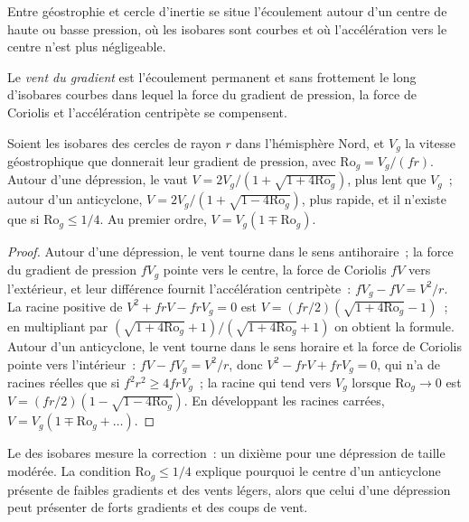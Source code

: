 Entre géostrophie et cercle d'inertie se situe l'écoulement autour d'un centre de
haute ou basse pression, où les isobares sont courbes et où
l'accélération vers le centre n'est plus négligeable.

\begin{definition}\label{def:b3:gfd-foundations:gradient}
Le \emph{vent du gradient} est l'écoulement permanent et sans frottement
le long d'isobares courbes dans lequel la force du gradient de pression, la
force de Coriolis et l'accélération centripète se compensent.
\end{definition}

\begin{proposition}\label{prop:b3:gfd-foundations:gradient}
Soient les isobares des cercles de rayon $r$ dans l'hémisphère Nord, et
$V_g$ la vitesse géostrophique que donnerait leur gradient de pression, avec
$\mathrm{Ro}_g = V_g/(fr)$. Autour d'une dépression, le  vaut
$V = 2V_g/(1 + \sqrt{1 + 4\mathrm{Ro}_g})$, plus lent que $V_g$~; autour d'un
anticyclone, $V = 2V_g/(1 + \sqrt{1 - 4\mathrm{Ro}_g})$, plus rapide, et il n'existe que
si $\mathrm{Ro}_g \le 1/4$. Au premier ordre, $V = V_g(1 \mp \mathrm{Ro}_g)$.
\end{proposition}

\begin{proof}
Autour d'une dépression, le vent tourne dans le sens antihoraire~; la force du gradient de pression
$fV_g$ pointe vers le centre, la force de Coriolis $fV$ vers l'extérieur, et leur
différence fournit l'accélération centripète~: $fV_g - fV = V^2/r$. La
racine positive de $V^2 + frV - frV_g = 0$ est $V = (fr/2)(\sqrt{1 +
4\mathrm{Ro}_g} - 1)$~; en multipliant par $(\sqrt{1 + 4\mathrm{Ro}_g} +
1)/(\sqrt{1 + 4\mathrm{Ro}_g} + 1)$ on obtient la formule. Autour d'un anticyclone, le
vent tourne dans le sens horaire et la force de Coriolis pointe vers l'intérieur~: $fV - fV_g =
V^2/r$, donc $V^2 - frV + frV_g = 0$, qui n'a de racines réelles que si $f^2r^2
\ge 4frV_g$~; la racine qui tend vers $V_g$ lorsque $\mathrm{Ro}_g \to 0$ est
$V = (fr/2)(1 - \sqrt{1 - 4\mathrm{Ro}_g})$. En développant les racines carrées,
$V = V_g(1 \mp \mathrm{Ro}_g + \dots)$.
\end{proof}

Le  des isobares mesure la correction~: un dixième pour une
dépression de taille modérée. La condition $\mathrm{Ro}_g \le 1/4$ explique
pourquoi le centre d'un anticyclone présente de faibles gradients et des vents légers, alors que
celui d'une dépression peut présenter de forts gradients et des coups de vent.

